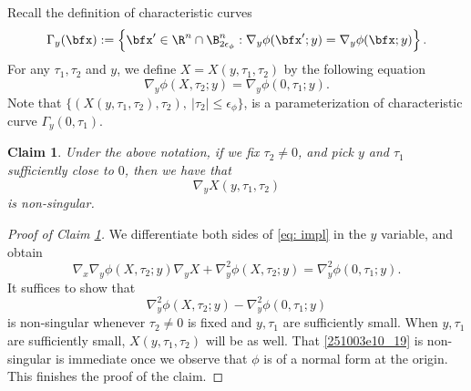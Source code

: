 \documentclass{article}
\numberwithin{equation}{section}
\theoremstyle{plain}
\newtheorem{claim}[theorem]{Claim}
\begin{document}
Recall the definition of characteristic curves
\begin{equation}
    \Gamma_y(\bfx):=\left\{\bfx' \in \R^n\cap \B^n_{2\epsilon_{\phi}}: \nabla_y \phi(\bfx'; y)=\nabla_y \phi(\bfx; y)\right\}.
\end{equation}
For any $\tau_1,\tau_2$ and $y$, we define $X=X(y,\tau_1,\tau_2)$ by the following equation
\begin{equation}\label{eq: impl}
     \nabla_y \phi(X,\tau_2; y) = \nabla_y \phi(0,\tau_1; y).
\end{equation}
Note that $\{(X(y,\tau_1,\tau_2),\tau_2),\ |\tau_2|\le \epsilon_\phi\}$, is a parameterization of characteristic curve $\Gamma_y(0,\tau_1)$.
\begin{claim}\label{250512claim2_1}
    Under the above notation, if we fix $\tau_2\neq 0$, and pick $y$ and $\tau_1$ sufficiently close to $0$, then we have that 
    \begin{equation}
    \nabla_y X(y,\tau_1,\tau_2)
    \end{equation}
    is non-singular. 
    \end{claim}
\begin{proof}[Proof of Claim \ref{250512claim2_1}]
We differentiate both sides of \eqref{eq: impl} in the $y$ variable, and obtain 
\begin{equation}\label{251208e4-14}
\nabla_x\nabla_y \phi(X, \tau_2; y)
\nabla_y X
+ \nabla^2_y \phi(X, \tau_2; y)= \nabla^2_y \phi(0, \tau_1; y).
\end{equation}
It suffices to show that 
\begin{equation}\label{251003e10_19}
\nabla^2_y \phi(X, \tau_2; y)- \nabla^2_y \phi(0, \tau_1; y)
\end{equation}
is non-singular whenever $\tau_2\neq 0$ is fixed and $y, \tau_1$ are sufficiently small. When $y, \tau_1$ are sufficiently small, $X(y,\tau_1,\tau_2)$ will be as well. That \eqref{251003e10_19} is non-singular is immediate once we observe that $\phi$ is of a normal form at the origin. This finishes the proof of the claim. 
\end{proof}
\end{document}

